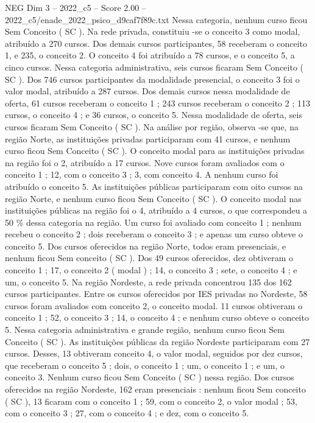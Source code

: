 \begin{textsample}{NEG Dim 3 – 2022\_c5 – Score 2.00 – 2022\_c5/enade\_2022\_psico\_d9caf7f89c.txt}
Nessa categoria, nenhum curso ficou Sem Conceito ( SC ).
Na rede privada, constituiu -se o conceito 3 como modal, atribuído a 270 cursos.
Dos demais cursos participantes, 58 receberam o conceito 1, e 235, o conceito 2.
O conceito 4 foi atribuído a 78 cursos, e o conceito 5, a cinco cursos.
Nessa categoria administrativa, seis cursos ficaram Sem Conceito ( SC ).
Dos 746 cursos participantes da modalidade presencial, o conceito 3 foi o valor modal, atribuído a 287 cursos.
Dos demais cursos nessa modalidade de oferta, 61 cursos receberam o conceito 1 ; 243 cursos receberam o conceito 2 ; 113 cursos, o conceito 4 ; e 36 cursos, o conceito 5.
Nessa modalidade de oferta, seis cursos ficaram Sem Conceito ( SC ).
Na análise por região, observa -se que, na região Norte, as instituições privadas participaram com 41 cursos, e nenhum curso ficou Sem Conceito ( SC ).
O conceito modal para as instituições privadas na região foi o 2, atribuído a 17 cursos.
Nove cursos foram avaliados com o conceito 1 ; 12, com o conceito 3 ; 3, com conceito 4.
A nenhum curso foi atribuído o conceito 5.
As instituições públicas participaram com oito cursos na região Norte, e nenhum curso ficou Sem Conceito ( SC ).
O conceito modal nas instituições públicas na região foi o 4, atribuído a 4 cursos, o que correspondeu a 50 \% dessa categoria na região.
Um curso foi avaliado com conceito 1 ; nenhum recebeu o conceito 2 ; dois receberam o conceito 3 ; e apenas um curso obteve o conceito 5.
Dos cursos oferecidos na região Norte, todos eram presenciais, e nenhum ficou Sem conceito ( SC ).
Dos 49 cursos oferecidos, dez obtiveram o conceito 1 ; 17, o conceito 2 ( modal ) ; 14, o conceito 3 ; sete, o conceito 4 ; e um, o conceito 5.
Na região Nordeste, a rede privada concentrou 135 dos 162 cursos participantes.
Entre os cursos oferecidos por IES privadas no Nordeste, 58 cursos foram avaliados com conceito 2, o conceito modal. 11 cursos obtiveram o conceito 1 ; 52, o conceito 3 ; 14, o conceito 4 ; e nenhum curso obteve o conceito 5.
Nessa categoria administrativa e grande região, nenhum curso ficou Sem Conceito ( SC ).
As instituições públicas da região Nordeste participaram com 27 cursos.
Desses, 13 obtiveram conceito 4, o valor modal, seguidos por dez cursos, que receberam o conceito 5 ; dois, o conceito 1 ; um, o conceito 1 ; e um, o conceito 3.
Nenhum curso ficou Sem Conceito ( SC ) nessa região.
Dos cursos oferecidos na região Nordeste, 162 eram presenciais : nenhum ficou Sem conceito ( SC ), 13 ficaram com o conceito 1 ; 59, com o conceito 2, o valor modal ; 53, com o conceito 3 ; 27, com o conceito 4 ; e dez, com o conceito 5.

\end{textsample}
